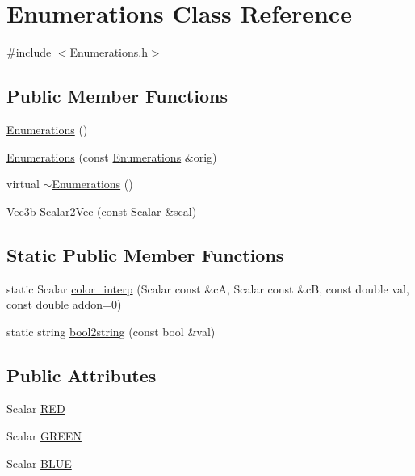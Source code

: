 \hypertarget{class_enumerations}{
\section{\-Enumerations \-Class \-Reference}
\label{class_enumerations}
}


{\ttfamily \#include $<$\-Enumerations.\-h$>$}

\subsection*{\-Public \-Member \-Functions}
\begin{DoxyCompactItemize}
\item 
\hyperlink{class_enumerations_ad675376494b7bbb89bd76a3b2f6bc117}{\-Enumerations} ()
\item 
\hyperlink{class_enumerations_a2b952a315442231104dec0eca2bc9aac}{\-Enumerations} (const \hyperlink{class_enumerations}{\-Enumerations} \&orig)
\item 
virtual \hyperlink{class_enumerations_a7e2e40ffce0c73a7b59c94869585e988}{$\sim$\-Enumerations} ()
\item 
\-Vec3b \hyperlink{class_enumerations_a9c0771916f304286423e5aa5d967040c}{\-Scalar2\-Vec} (const \-Scalar \&scal)
\end{DoxyCompactItemize}
\subsection*{\-Static \-Public \-Member \-Functions}
\begin{DoxyCompactItemize}
\item 
static \-Scalar \hyperlink{class_enumerations_aefb40bbbf0031dbbf1b5a82c902f5e91}{color\-\_\-interp} (\-Scalar const \&c\-A, \-Scalar const \&c\-B, const double val, const double addon=0)
\item 
static string \hyperlink{class_enumerations_afbd60a6e41596bdb5e759d4921581d8e}{bool2string} (const bool \&val)
\end{DoxyCompactItemize}
\subsection*{\-Public \-Attributes}
\begin{DoxyCompactItemize}
\item 
\-Scalar \hyperlink{class_enumerations_a4a71e14de92dd0252f0ba60755511fa7}{\-R\-E\-D}
\item 
\-Scalar \hyperlink{class_enumerations_a4d0594e227e2d94eab224f35e8947db6}{\-G\-R\-E\-E\-N}
\item 
\-Scalar \hyperlink{class_enumerations_aa763ae445f0c76b386c96d950d9af87b}{\-B\-L\-U\-E}
\end{DoxyCompactItemize}


